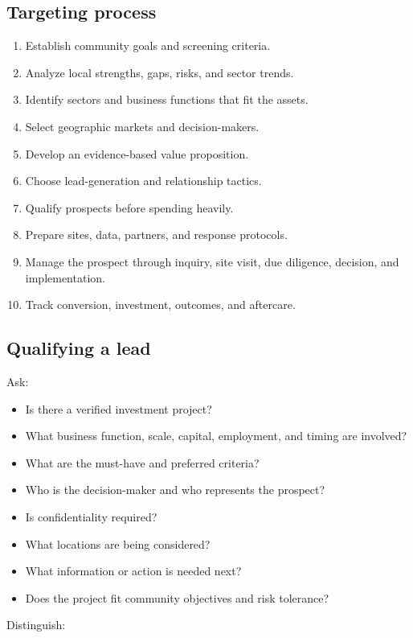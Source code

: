 \documentclass[11pt,letterpaper,oneside,openany]{book}
\begin{document}
\subsection[Targeting process]{Targeting process}
\begin{enumerate}
\item Establish community goals and screening criteria.
\item Analyze local strengths, gaps, risks, and sector trends.
\item Identify sectors and business functions that fit the assets.
\item Select geographic markets and decision-makers.
\item Develop an evidence-based value proposition.
\item Choose lead-generation and relationship tactics.
\item Qualify prospects before spending heavily.
\item Prepare sites, data, partners, and response protocols.
\item Manage the prospect through inquiry, site visit, due diligence, decision, and implementation.
\item Track conversion, investment, outcomes, and aftercare.
\end{enumerate}


\subsection[Qualifying a lead]{Qualifying a lead}
Ask:


\begin{itemize}
\item Is there a verified investment project?
\item What business function, scale, capital, employment, and timing are involved?
\item What are the must-have and preferred criteria?
\item Who is the decision-maker and who represents the prospect?
\item Is confidentiality required?
\item What locations are being considered?
\item What information or action is needed next?
\item Does the project fit community objectives and risk tolerance?
\end{itemize}


Distinguish:
\end{document}

